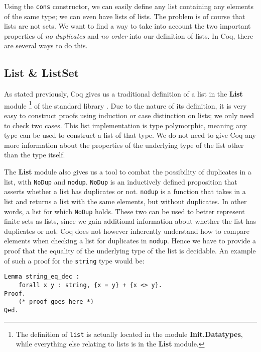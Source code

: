 Using the \lstinline{cons} constructor, we can easily define any list containing any elements of the same type;
we can even have lists of lists.
The problem is of course that lists are not sets. We want to find a way to take into account the two important properties
of \textit{no duplicates} and \textit{no order} into our definition of lists.
In Coq, there are several ways to do this.


\subsection{List \& ListSet}
\label{ssec:list_listset}

As stated previously, Coq gives us a traditional definition of a list in the \textbf{List} module
\footnote{The definition of \lstinline{list} is actually located in the module \textbf{Init.Datatypes}, while everything else relating to lists is in the \textbf{List} module.} of the standard library \cite{coqlist}.
Due to the nature of its definition, it is very easy to construct proofs using induction or case distinction on lists;
we only need to check two cases.
This list implementation is type polymorphic, meaning any type can be used to construct a list of that type.
We do not need to give Coq any more information about the properties of the underlying type of the list other than the type itself.

The \textbf{List} module also gives us a tool to combat the possibility of duplicates in a list,
with \lstinline{NoDup} and \lstinline{nodup}.
\lstinline{NoDup} is an inductively defined proposition that asserts whether a list has duplicates or not.
\lstinline{nodup} is a function that takes in a list and returns a list with the same elements, but without duplicates.
In other words, a list for which \lstinline{NoDup} holds.
These two can be used to better represent finite sets as lists, since
we gain additional information about whether the list has duplicates or not.
Coq does not however inherently understand how to compare elements when checking a list for duplicates in \lstinline{nodup}.
Hence we have to provide a proof that the equality of the underlying type of the list is decidable.
An example of such a proof for the \lstinline{string} type would be:

\begin{minipage}{\linewidth}
\begin{lstlisting}[language=Coq, label={lst:string_eq_dec}, caption={Decidability proof for string equality in Coq}]
Lemma string_eq_dec :
    forall x y : string, {x = y} + {x <> y}.
Proof.
    (* proof goes here *)
Qed.
\end{lstlisting}
\end{minipage}

